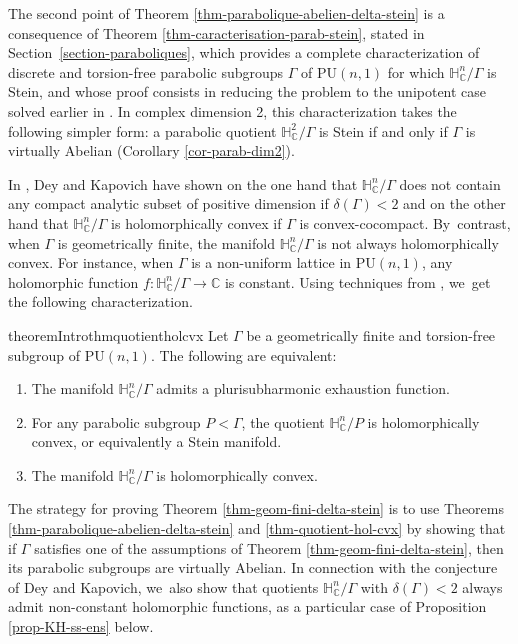 \documentclass[11pt]{article}
\theoremstyle{definition}
\newcommand{\C}{\mathbb{C}}
\newcommand{\HNC}{\mathbb{H}^{n}_{\C}}
\newcommand{\PU}{\mathrm{PU}}
\def\C{\mathbb{C}}
\newcommand{\HNC}{\mathbb{H}^{n}_{\C}}
\newcommand{\PU}{\mathrm{PU}}
\begin{document}
The second point of Theorem \ref{thm-parabolique-abelien-delta-stein} is a consequence of Theorem \ref{thm-caracterisation-parab-stein}, stated in Section~\ref{section-paraboliques}, which provides a complete characterization of discrete and torsion-free parabolic subgroups $\Gamma$ of $\PU(n,1)$ for which $\HNC/\Gamma$ is Stein, and whose proof consists in reducing the problem to the unipotent case solved earlier in \cite{miebachQuotientsBoundedHomogeneous2024}. In complex dimension 2, this characterization takes the following simpler form: a parabolic quotient $\mathbb{H}^{2}_{\C}/\Gamma$ is Stein if and only if $\Gamma$ is virtually Abelian (Corollary \ref{cor-parab-dim2}).

In \cite{deyNoteComplexhyperbolicKleinian2020}, Dey and Kapovich have shown on the one hand that $\HNC/\Gamma$ does not contain any compact analytic subset of positive dimension if $\delta(\Gamma)<2$ and on the other hand that $\HNC/\Gamma$ is holomorphically convex if $\Gamma$ is convex-cocompact. By~contrast, when $\Gamma$ is geometrically finite, the manifold $\HNC/\Gamma$ is not always holomorphically convex. For instance, when $\Gamma$ is a non-uniform lattice in $\PU(n,1)$, any holomorphic function $f:\HNC/\Gamma\to \C$ is constant. Using techniques from \cite{chenDiscreteGroupsHolomorphic2013}, we~get the following characterization.

\begin{restatable}{theoremIntro}{thmquotientholcvx}\label{thm-quotient-hol-cvx}
Let $\Gamma$ be a geometrically finite and torsion-free subgroup of $\PU(n,1)$. The following are equivalent: 
\begin{enumerate}
\item\label{thm-quotient-hol-cvx1} The manifold $\HNC/\Gamma$ admits a plurisubharmonic exhaustion function.
\item\label{thm-quotient-hol-cvx2} For any parabolic subgroup $P<\Gamma$, the quotient $\HNC/P$ is holomorphically convex, or equivalently a Stein manifold.
\item\label{thm-quotient-hol-cvx3} The manifold $\HNC/\Gamma$ is holomorphically convex.
\end{enumerate}
\end{restatable}

The strategy for proving Theorem \ref{thm-geom-fini-delta-stein} is to use Theorems \ref{thm-parabolique-abelien-delta-stein} and \ref{thm-quotient-hol-cvx} by showing that if $\Gamma$ satisfies one of the assumptions of Theorem \ref{thm-geom-fini-delta-stein}, then its parabolic subgroups are virtually Abelian. In connection with the conjecture of Dey and Kapovich, we~also show that quotients $\HNC/\Gamma$ with $\delta(\Gamma)<2$ always admit non-constant holomorphic functions, as a particular case of Proposition \ref{prop-KH-ss-ens} below.
\end{document}
